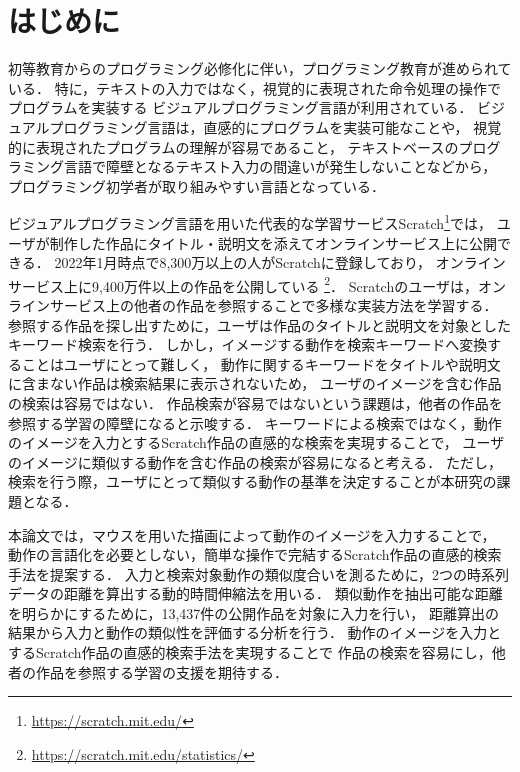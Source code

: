 \documentclass[11pt]{jreport}
\begin{document}
\newpage
{}	%




\chapter{はじめに}

初等教育からのプログラミング必修化に伴い，プログラミング教育が進められている．
特に，テキストの入力ではなく，視覚的に表現された命令処理の操作でプログラムを実装する
ビジュアルプログラミング言語が利用されている．
ビジュアルプログラミング言語は，直感的にプログラムを実装可能なことや，
視覚的に表現されたプログラムの理解が容易であること，
テキストベースのプログラミング言語で障壁となるテキスト入力の間違いが発生しないことなどから，
プログラミング初学者が取り組みやすい言語となっている．

ビジュアルプログラミング言語を用いた代表的な学習サービスScratch\footnote{ \url{https://scratch.mit.edu/}}では，
ユーザが制作した作品にタイトル・説明文を添えてオンラインサービス上に公開できる．
2022年1月時点で8,300万以上の人がScratchに登録しており，
オンラインサービス上に9,400万件以上の作品を公開している
\footnote{\url{https://scratch.mit.edu/statistics/}}．
Scratchのユーザは，オンラインサービス上の他者の作品を参照することで多様な実装方法を学習する\cite{spfa}．
参照する作品を探し出すために，ユーザは作品のタイトルと説明文を対象としたキーワード検索を行う．
しかし，イメージする動作を検索キーワードへ変換することはユーザにとって難しく，
動作に関するキーワードをタイトルや説明文に含まない作品は検索結果に表示されないため，
ユーザのイメージを含む作品の検索は容易ではない\cite{wild}．
作品検索が容易ではないという課題は，他者の作品を参照する学習の障壁になると示唆する．
キーワードによる検索ではなく，動作のイメージを入力とするScratch作品の直感的な検索を実現することで，
ユーザのイメージに類似する動作を含む作品の検索が容易になると考える．
ただし，検索を行う際，ユーザにとって類似する動作の基準を決定することが本研究の課題となる．

本論文では，マウスを用いた描画によって動作のイメージを入力することで，
動作の言語化を必要としない，簡単な操作で完結するScratch作品の直感的検索手法を提案する．
入力と検索対象動作の類似度合いを測るために，2つの時系列データの距離を算出する動的時間伸縮法を用いる．
類似動作を抽出可能な距離を明らかにするために，13,437件の公開作品を対象に入力を行い，
距離算出の結果から入力と動作の類似性を評価する分析を行う．
動作のイメージを入力とするScratch作品の直感的検索手法を実現することで
作品の検索を容易にし，他者の作品を参照する学習の支援を期待する．
\end{document}
